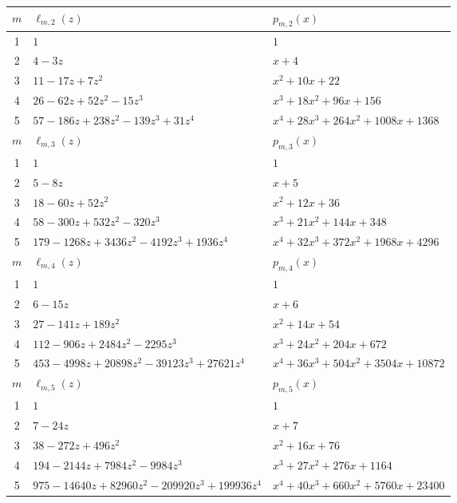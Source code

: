 \documentclass[12pt,reqno]{article}
\numberwithin{sfootnote}{section}
\newcommand{\tabletopstrut}[0]{\rule{0pt}{3ex}}
\numberwithin{equation}{section}
\theoremstyle{DefaultTheoremStyle}
\theoremstyle{definition}
\begin{document}
\begin{table}[h]
\begin{subtable}{\textwidth}
\begin{tabular}{|c|l|l|} \hline 
\hline\tabletopstrut 
$m$ & $\ell_{m,2}(z)$ & $p_{m,2}(x)$ \\ \hline 
1 & $1$ & $1$ \\ 
2 & $4 - 3z$ & $x+4$ \\ 
3 & $11 - 17z + 7z^2$ & $x^2+10x+22$ \\ 
4 & $26 - 62z + 52z^2  - 15z^3$ & 
    $x^3+18x^2+96x+156$ \\ 
5 & $57 - 186z + 238z^2 - 139z^3 + 31z^4$ & 
    $x^4+28x^3+264x^2+1008x+1368$ \\ \hline 
\hline\tabletopstrut 
$m$ & $\ell_{m,3}(z)$ & $p_{m,3}(x)$ \\ \hline 
1 & $1$ & $1$ \\ 
2 & $5 - 8z$ & $x+5$ \\ 
3 & $18 - 60z + 52 z^2$ & $x^2+12x+36$ \\ 
4 & $58 - 300 z + 532 z^2  - 320 z^3$ & $x^3+21x^2+144x+348$ \\ 
5 & $179 - 1268 z + 3436 z^2 - 4192 z^3 + 1936 z^4$ & 
    $x^4+32x^3+372x^2+1968x+4296$ \\ \hline 
\hline\tabletopstrut 
$m$ & $\ell_{m,4}(z)$ & $p_{m,4}(x)$ \\ \hline 
1 & $1$ & $1$ \\ 
2 & $6 - 15z$ & $x+6$ \\ 
3 & $27 - 141z + 189 z^2$ & $x^2+14x+54$ \\ 
4 & $112 - 906 z + 2484 z^2  - 2295 z^3$ & 
    $x^3+24x^2+204x+672$ \\ 
5 & $453 - 4998 z + 20898 z^2 - 39123 z^3 + 27621 z^4$ & 
    $x^4+36x^3+504x^2+3504x+10872$ \\ \hline 
\hline\tabletopstrut 
$m$ & $\ell_{m,5}(z)$ & $p_{m,5}(x)$ \\ \hline 
1 & $1$ & $1$ \\ 
2 & $7 - 24z$ & $x+7$ \\ 
3 & $38 - 272z + 496 z^2$ & 
    $x^2+16x+76$ \\ 
4 & $194 - 2144 z + 7984 z^2  - 9984 z^3$ & 
    $x^3+27x^2+276x+1164$ \\ 
5 & $975 - 14640 z + 82960 z^2 - 209920 z^3 + 199936 z^4$ & 
    $x^4+40x^3+660x^2+5760x+23400$ \\ \hline 
\hline 
\end{tabular} 


\end{subtable}
\end{table}
\end{document}
